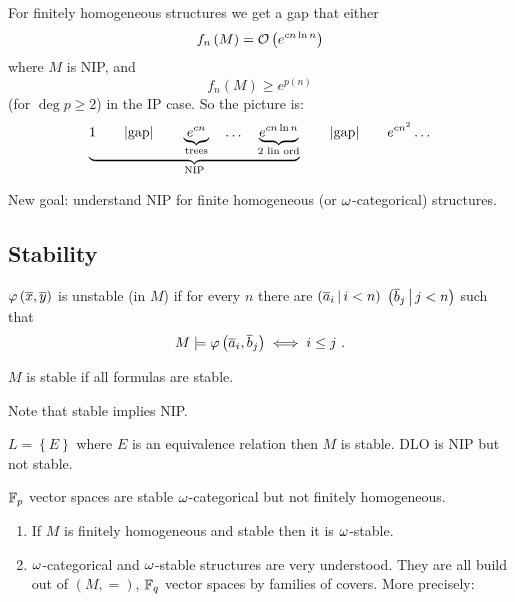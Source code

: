 \documentclass{amsart}
\begin{document}
For finitely homogeneous structures we get a gap that either 
\begin{equation}
f_n\left(M\right) = \mathcal{O}\left(e^{cn \ln n}\right)
\end{equation}
where $M$ is NIP, and
\begin{equation}
f_n\left(M\right)\geq e^{p\left(n\right)}
\end{equation}
(for $\deg p\geq 2$) in the IP case.
So the picture is:
\begin{equation}
\underbrace{
1 
\qquad\vert\text{gap}\vert \qquad
\underbrace{e^{cn}}_{\text{trees}}
\quad\ldots\quad
\underbrace{e^{cn\ln n}}_{2\text{ lin ord}}
}_{\text{NIP}}
\qquad\vert\text{gap}\vert \qquad
e^{cn^2} \ldots
\end{equation}

New goal: understand NIP for finite homogeneous (or $\omega$-categorical) structures.

\subsection{Stability}

\begin{defn}
$\varphi\left(\overline{x} , \overline{y}\right)$ is unstable (in $M$) if for every $n$ there are
$\left(\overline{a}_i \, \middle\vert \, i < n\right)$
$\left(\overline{b}_j \, \middle\vert \, j < n\right)$
such that
\begin{equation}
M\models \varphi\left(\overline{a}_i , \overline{b}_j\right) \iff i\leq j \ .
\end{equation}
\end{defn}

\begin{defn}
$M$ is stable if all formulas are stable. 
\end{defn}

Note that stable implies NIP.

\begin{exm}
$L = \left\{E\right\}$ where $E$ is an equivalence relation then $M$ is stable. 
DLO is NIP but not stable.
\end{exm}

\begin{exm}
$\mathbb{F}_p$ vector spaces are stable $\omega$-categorical but not finitely homogeneous.
\end{exm}

\begin{enumerate}
\item If $M$ is finitely homogeneous and stable then it is $\omega$-stable.
\item $\omega$-categorical and $\omega$-stable structures are very understood. They are all
build out of $\left(M , =\right)$, $\mathbb{F}_q$ vector spaces by families of covers.
More precisely:
\end{enumerate}
\end{document}
